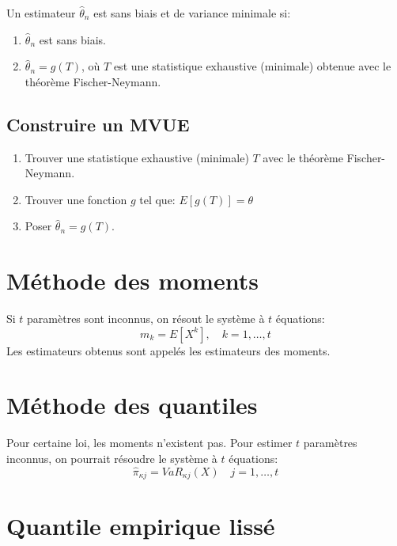 \documentclass[]{book}
\providecommand{\tightlist}{%
  \setlength{\itemsep}{0pt}\setlength{\parskip}{0pt}}
\theoremstyle{definition}
\theoremstyle{definition}
\theoremstyle{definition}
\theoremstyle{remark}
\begin{document}
Un estimateur \(\hat{\theta}_n\) est sans biais et de variance minimale
si:

\begin{enumerate}
\def\labelenumi{\arabic{enumi}.}
\tightlist
\item
  \(\hat{\theta}_n\) est sans biais.
\item
  \(\hat{\theta}_n=g(T)\), où \(T\) est une statistique exhaustive
  (minimale) obtenue avec le théorème Fischer-Neymann.
\end{enumerate}

\subsection{Construire un MVUE}\label{construire-un-mvue}

\begin{enumerate}
\def\labelenumi{\arabic{enumi}.}
\tightlist
\item
  Trouver une statistique exhaustive (minimale) \(T\) avec le théorème
  Fischer-Neymann.
\item
  Trouver une fonction \(g\) tel que: \(E[g(T)]=\theta\)
\item
  Poser \(\hat{\theta}_n=g(T)\).
\end{enumerate}

\section{Méthode des moments}\label{methode-des-moments}

Si \(t\) paramètres sont inconnus, on résout le système à \(t\)
équations: \[
m_k=E\left[X^k\right],\quad k=1,\dots,t
\] Les estimateurs obtenus sont appelés les estimateurs des moments.

\section{Méthode des quantiles}\label{methode-des-quantiles}

Pour certaine loi, les moments n'existent pas. Pour estimer \(t\)
paramètres inconnus, on pourrait résoudre le système à \(t\) équations:
\[
\hat{\pi}_{\kappa j}=VaR_{\kappa j}(X)\quad j=1,\dots,t
\]

\section{Quantile empirique lissé}\label{quantile-empirique-lisse}
\end{document}
